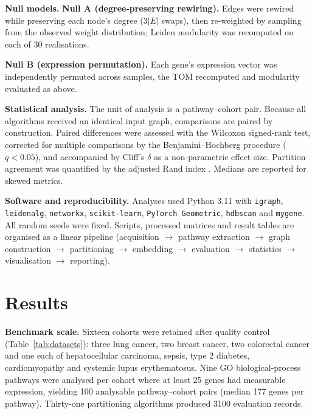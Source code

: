 \documentclass[twocolumn,10pt,letterpaper]{article}
\begin{document}
\noindent\textbf{Null models.} \noindent\textbf{Null A (degree-preserving rewiring).} Edges were rewired while preserving
each node's degree ($3|E|$ swaps), then re-weighted by sampling from the observed weight
distribution; Leiden modularity was recomputed on each of 30 realisations.

\noindent\textbf{Null B (expression permutation).} Each gene's expression vector was
independently permuted across samples, the TOM recomputed and modularity evaluated as above.

\noindent\textbf{Statistical analysis.} The unit of analysis is a pathway--cohort pair. Because all algorithms received an identical
input graph, comparisons are paired by construction. Paired differences were assessed with
the Wilcoxon signed-rank test, corrected for multiple comparisons by the
Benjamini--Hochberg procedure \citep{benjamini1995fdr} ($q<0.05$), and accompanied by
Cliff's $\delta$ \citep{cliff1993dominance} as a non-parametric effect size. Partition
agreement was quantified by the adjusted Rand index \citep{hubert1985ari}. Medians are reported for skewed metrics.

\noindent\textbf{Software and reproducibility.} Analyses used Python 3.11 with \texttt{igraph}, \texttt{leidenalg}, \texttt{networkx},
\texttt{scikit-learn}, \texttt{PyTorch Geometric}, \texttt{hdbscan} and \texttt{mygene}.
All random seeds were fixed. Scripts, processed matrices and result tables are organised as
a linear pipeline (acquisition $\rightarrow$ pathway extraction $\rightarrow$ graph
construction $\rightarrow$ partitioning $\rightarrow$ embedding $\rightarrow$ evaluation
$\rightarrow$ statistics $\rightarrow$ visualisation $\rightarrow$ reporting).

\section{Results}

\noindent\textbf{Benchmark scale.} Sixteen cohorts were retained after quality control (Table~\ref{tab:datasets}): three lung
cancer, two breast cancer, two colorectal cancer and one each of hepatocellular carcinoma,
sepsis, type 2 diabetes, cardiomyopathy and systemic lupus erythematosus. Nine GO
biological-process pathways were analysed per cohort where at least 25 genes had
measurable expression, yielding 100 analysable pathway--cohort pairs (median 177 genes
per pathway). Thirty-one partitioning algorithms produced 3100 evaluation records.
\end{document}
